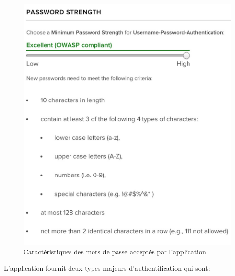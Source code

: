 \begin{figure}[!ht]
\begin{center}
\includegraphics[scale=0.4]{e4.jpg}
\caption{Caractéristiques des mots de passe acceptés par l’application}
\label{e4}
\end{center}
\end{figure}

L'application fournit deux types majeurs d’authentification qui sont:

